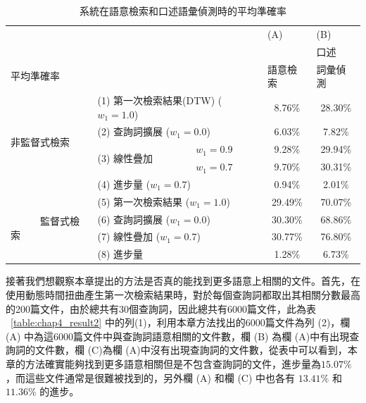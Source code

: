 \begin{table}[htbp]
  \centering    

    \begin{tabular}{|l|l|l|c|c|}
    \hline
    \multicolumn{3}{|l|}{} & \multicolumn{1}{l|}{(A)} & \multicolumn{1}{l|}{(B)} \\
    \multicolumn{3}{|l|}{} & \multicolumn{1}{l|}{} & \multicolumn{1}{l|}{口述} \\
    \multicolumn{3}{|l|}{平均準確率} & \multicolumn{1}{l|}{語意檢索} & \multicolumn{1}{l|}{詞彙偵測} \\
    \hline

    \multirow{5}[2]{*}{\begin{sideways}非監督式檢索~~ \end{sideways}} & \multicolumn{2}{l|}{(1) 第一次檢索結果(DTW) ($w_1=1.0$)} & 8.76\% & 28.30\% \\
    \cline{2-5} 
\cline{4-5}          & \multicolumn{2}{l|}{(2) 查詢詞擴展 ($w_1=0.0$)} & 6.03\% & 7.82\% \\
\cline{2-5}          & \multirow{2}[4]{*}{(3) 線性疊加} & $w_1=0.9$ & 9.28\% & 29.94\% \\
\cline{3-5}          &       & $w_1=0.7$ & 9.70\% & 30.31\% \\
\cline{2-5}          & \multicolumn{2}{l|}{(4) 進步量 ($w_1=0.7$)} & 0.94\% & 2.01\% \\
    \hline
    \multirow{4}[8]{*}{\begin{sideways} ~~~~~~監督式檢索 \end{sideways}} & \multicolumn{2}{l|}{(5) 第一次檢索結果 ($w_1=1.0$)} & 29.49\% & 70.07\% \\
\cline{2-5}          & \multicolumn{2}{l|}{(6) 查詢詞擴展 ($w_1=0.0$)} & 30.30\% & 68.86\% \\
\cline{2-5}          & \multicolumn{2}{l|}{(7) 線性疊加 ($w_1=0.7$)} & 30.77\% & 76.80\% \\
\cline{2-5}          & \multicolumn{2}{l|}{(8) 進步量} & 1.28\% & 6.73\% \\
    \hline
    \end{tabular}%

  \caption{系統在語意檢索和口述語彙偵測時的平均準確率}
  \label{table:chap4_result1}%

\end{table}%

接著我們想觀察本章提出的方法是否真的能找到更多語意上相關的文件。首先，在使用動態時間扭曲產生第一次檢索結果時，對於每個查詢詞都取出其相關分數最高的200篇文件，由於總共有30個查詢詞，因此總共有6000篇文件，此為表 ~\ref{table:chap4_result2} 中的列(1)，利用本章方法找出的6000篇文件為列 (2)，欄 (A) 中為這6000篇文件中與查詢詞語意相關的文件數，欄 (B) 為欄 (A)中有出現查詢詞的文件數，欄 (C)為欄 (A)中沒有出現查詢詞的文件數，從表中可以看到，本章的方法確實能夠找到更多語意相關但是不包含查詢詞的文件，進步量為$15.07\%$，而這些文件通常是很難被找到的，另外欄 (A) 和欄 (C) 中也各有 $13.41\%$ 和 $11.36\%$ 的進步。

